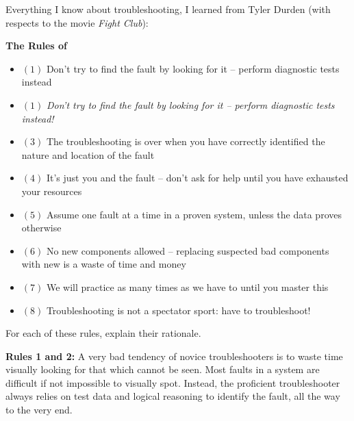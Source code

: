 

Everything I know about troubleshooting, I learned from Tyler Durden (with respects to the movie {\it Fight Club}):

\vskip 10pt

\centerline{\bf The Rules of }

\begin{itemize}
\item{$(1)$} Don't try to find the fault by looking for it -- perform diagnostic tests instead
\vskip 10pt
\item{$(1)$} {\it Don't try to find the fault by looking for it -- perform diagnostic tests instead!}
\vskip 10pt
\item{$(3)$} The troubleshooting is over when you have correctly identified the nature and location of the fault
\vskip 10pt
\item{$(4)$} It's just you and the fault -- don't ask for help until you have exhausted your resources
\vskip 10pt
\item{$(5)$} Assume one fault at a time in a proven system, unless the data proves otherwise
\vskip 10pt
\item{$(6)$} No new components allowed -- replacing suspected bad components with new is a waste of time and money
\vskip 10pt
\item{$(7)$} We will practice as many times as we have to until you master this
\vskip 10pt
\item{$(8)$} Troubleshooting is not a spectator sport:  have to troubleshoot!
\end{itemize}

\vskip 10pt

For each of these rules, explain their rationale.







{\bf Rules 1 and 2:} A very bad tendency of novice troubleshooters is to waste time visually looking for that which cannot be seen.  Most faults in a system are difficult if not impossible to visually spot.  Instead, the proficient troubleshooter always relies on test data and logical reasoning to identify the fault, all the way to the very end.

